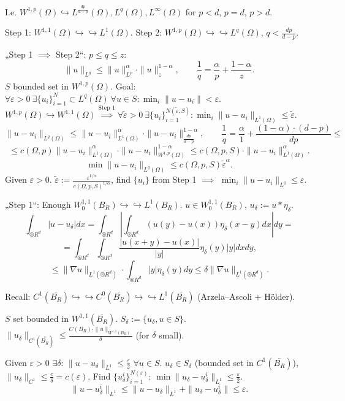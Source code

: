 \documentclass[12pt]{article}					%
\begin{document}
\begin{veta}
\begin{dukazin}[Case $d > p$ ($d = p$), only for $u \in C_0^∞(®R^d)$]
		I.e. $W^{1, p}(Ω) \hookrightarrow L^{\frac{dp}{d - p}}(Ω), L^q(Ω), L^∞(Ω)$ for $p < d$, $p = d$, $p > d$.
	\end{dukazin}

	\begin{dukazin}
		Step 1: $W^{1, 1}(Ω) \hookrightarrow\hookrightarrow L^1(Ω)$. Step 2: $W^{1, p}(Ω) \hookrightarrow\hookrightarrow L^q(Ω)$, $q < \frac{dp}{d - p}$.

		„Step 1 $\implies$ Step 2“: $p ≤ q ≤ z$:
		$$ \|u\|_{L^q} ≤ \|u\|_{L^p}^α·\|u\|_z^{1 - α}, \qquad \frac{1}{q} = \frac{α}{p} + \frac{1 - α}{z}. $$
		$S$ bounded set in $W^{1, p}(Ω)$. Goal: $\forall ε > 0\ \exists \{u_i\}_{i=1}^N \subset L^q(Ω)\ \forall u \in S: \min_i \|u - u_i\| < ε$.
		$W^{1, p}(Ω) \hookrightarrow W^{1, 1}(Ω) \overset{\text{Step 1}}\implies \forall \tilde ε > 0\ \exists \{u_i\}_{i=1}^{N(\tilde ε, S)}: \min_i \|u - u_i\|_{L^1(Ω)} ≤ \tilde ε$.
		$$ \|u - u_i\|_{L^q(Ω)} ≤ \|u - u_i\|_{L^1(Ω)}^α·\|u - u_i\|_{\frac{dp}{d - p}}^{1 - α}, \qquad \frac{1}{q} = \frac{α}{1} + \frac{(1 - α)·(d - p)}{dp} ≤ $$
		$$ ≤ c(Ω, p) \|u - u_i\|_{L^1(Ω)}^α·\|u - u_i\|_{W^{1, p}(Ω)}^{1 - α} ≤ c(Ω, p, S)·\|u - u_i\|_{L^1(Ω)}^α. $$
		$$ \min\|u - u_i\|_{L^q(Ω)} ≤ c(Ω, p, S) \tilde ε^α. $$
		Given $ε > 0$. $\tilde ε := \frac{ε^{1 / α}}{c(Ω, p, S)^{1 / α}}$, find $\{u_i\}$ from Step 1 $\implies$ $\min_i \|u - u_i\|_{L^q} ≤ ε$.

		„Step 1“: Enough $W_0^{1, 1}(B_R) \hookrightarrow\hookrightarrow L^1(B_R)$. $u \in W_0^{1, 1}(B_R)$, $u_δ := u * η_δ$.
		$$ \int_{®R^d} |u - u_δ| dx = \int_{®R^d} \left|\int_{®R^d}(u(y) - u(x)) η_δ(x - y) dx \right| dy = $$
		$$ = \int_{®R^d} \int_{®R^d} \frac{|u(x + y) - u(x)|}{|y|} η_δ(y) |y| dx dy, $$
		$$ ≤ \|\nabla u\|_{L^1(®R^d)} · \int_{®R^d} |y| η_δ(y) dy ≤ δ \|\nabla u\|_{L^1(®R^d)}. $$

		Recall: $C^1(\overline{B_R}) \hookrightarrow\hookrightarrow C^0(\overline{B_R}) \hookrightarrow\hookrightarrow L^1(\overline{B_R})$ (Arzela–Ascoli + Hölder).

		$S$ set bounded in $W^{1, 1}(\overline{B_R})$. $S_δ := \{u_δ, u \in S\}$. $\|u_δ\|_{C^1(\overline{\overline{B_R}})} ≤ \frac{C(B_R)·\|u\|_{W^{1, 1}(B_R)}}{δ}$ (for $δ$ small).

		Given $ε > 0$ $\exists δ$: $\|u - u_δ\|_{L^1} ≤ \frac{ε}{2}$ $\forall u \in S$. $u_δ \in S_δ$ (bounded set in $C^1(\overline{B_R})$), $\|u_δ\|_{C^1} ≤ \frac{c}{δ} = c(ε)$. Find $\{u_δ^i\}_{i=1}^{N(ε)}$: $\min \|u_δ - u_δ^i\|_{L^1} ≤ \frac{ε}{2}$.
		$$ \|u - u_δ^i\|_{L^1} ≤ \|u - u_δ\|_{L^1} + \|u_δ - u_δ^i\| ≤ ε. $$
	\end{dukazin}
\end{veta}
\end{document}
